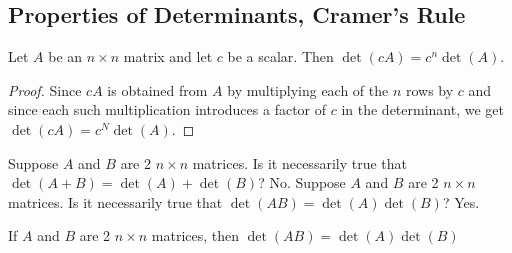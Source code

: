 \documentclass[12pt]{article}
\begin{document}
 \subsection{Properties of Determinants, Cramer's Rule} 
 \begin{theorem} Let $A$ be an $n \times n$ matrix and let $c$ be a scalar. Then $\det(cA) = c^n\det(A)$. \end{theorem} 
 \begin{proof} Since $cA$ is obtained from $A$ by multiplying each of the $n$ rows by $c$ and since each such multiplication introduces a factor of $c$ in the determinant, we get $\det(cA) = c^N\det(A)$. \end{proof} 
 Suppose $A$ and $B$ are 2 $n \times n$ matrices. Is it necessarily true that $ \det(A + B) = \det(A) + \det(B)$? No. \newline Suppose $A$ and $B$ are 2 $n \times n$ matrices. Is it necessarily true that $\det(AB) = \det(A)\det(B)$? Yes. \newline
 \begin{theorem} If $A$ and $B$ are 2 $n \times n$ matrices, then $\det(AB) = \det(A)\det(B)$ \end{theorem}
\end{document}
